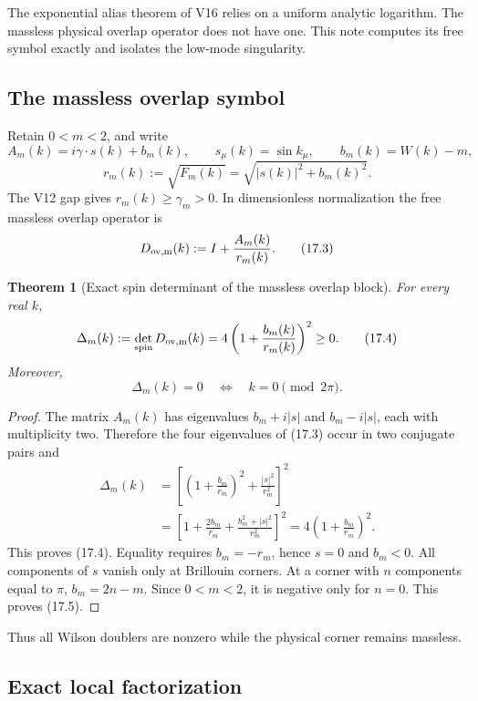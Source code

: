 \documentclass[11pt]{article}
\newtheorem{theorem}{Theorem}[section]
\begin{document}
The exponential alias theorem of V16 relies on a uniform analytic
logarithm.  The massless physical overlap operator does not have one.
This note computes its free symbol exactly and isolates the low-mode
singularity.

\subsection{The massless overlap symbol}

Retain \(0<m<2\), and write
\[
 A_m(k)=i\gamma\cdot s(k)+b_m(k),
 \qquad
 s_\mu(k)=\sin k_\mu,
 \qquad
 b_m(k)=W(k)-m,
 \tag{17.1}
\]
\[
 r_m(k):=\sqrt{F_m(k)}
 =
 \sqrt{|s(k)|^2+b_m(k)^2}.
 \tag{17.2}
\]
The V12 gap gives \(r_m(k)\geq\gamma_m>0\).  In dimensionless
normalization the free massless overlap operator is
\[
 D_{\rm ov,m}(k)
 :=
 I+\frac{A_m(k)}{r_m(k)}.
 \tag{17.3}
\]

\begin{theorem}[Exact spin determinant of the massless overlap block]
\label{thm:v11v17-overlap-det}
For every real \(k\),
\[
 \Delta_m(k)
 :=
 \det_{\rm spin}D_{\rm ov,m}(k)
 =
 4\left(1+\frac{b_m(k)}{r_m(k)}\right)^2
 \geq0.
 \tag{17.4}
\]
Moreover,
\[
 \Delta_m(k)=0
 \quad\Longleftrightarrow\quad
 k=0\pmod{2\pi}.
 \tag{17.5}
\]
\end{theorem}

\begin{proof}
The matrix \(A_m(k)\) has eigenvalues
\(b_m+i|s|\) and \(b_m-i|s|\), each with multiplicity two.  Therefore
the four eigenvalues of (17.3) occur in two conjugate pairs and
\[
\begin{split}
 \Delta_m(k)
 &=
 \left[
 \left(1+\frac{b_m}{r_m}\right)^2
 +\frac{|s|^2}{r_m^2}
 \right]^2\\
 &=
 \left[
 1+\frac{2b_m}{r_m}
 +\frac{b_m^2+|s|^2}{r_m^2}
 \right]^2
 =
 4\left(1+\frac{b_m}{r_m}\right)^2.
\end{split}
\]
This proves (17.4).  Equality requires
\(b_m=-r_m\), hence \(s=0\) and \(b_m<0\).
All components of \(s\) vanish only at Brillouin corners.  At a corner
with \(n\) components equal to \(\pi\),
\(b_m=2n-m\).  Since \(0<m<2\), it is negative only for \(n=0\).
This proves (17.5).
\end{proof}

Thus all Wilson doublers are nonzero while the physical corner remains
massless.

\subsection{Exact local factorization}
\end{document}
